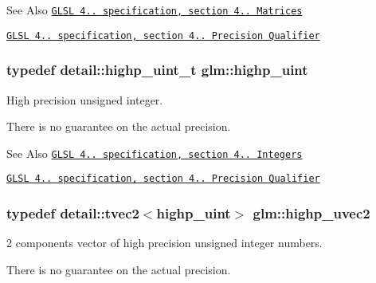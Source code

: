 \begin{DoxySeeAlso}{See Also}
\href{http://www.opengl.org/registry/doc/GLSLangSpec.4.20.8.pdf}{\tt G\-L\-S\-L 4.. specification, section 4.. Matrices} 

\href{http://www.opengl.org/registry/doc/GLSLangSpec.4.20.8.pdf}{\tt G\-L\-S\-L 4.. specification, section 4.. Precision Qualifier} 
\end{DoxySeeAlso}
\hypertarget{group__core__precision_gabfd1cf11193324a5f77d3831b6ac3205}{
\subsubsection[{highp\-\_\-uint}]{\setlength{\rightskip}{0pt plus 5cm}typedef detail\-::highp\-\_\-uint\-\_\-t {\bf glm\-::highp\-\_\-uint}}}\label{group__core__precision_gabfd1cf11193324a5f77d3831b6ac3205}


High precision unsigned integer. 

There is no guarantee on the actual precision.

\begin{DoxySeeAlso}{See Also}
\href{http://www.opengl.org/registry/doc/GLSLangSpec.4.20.8.pdf}{\tt G\-L\-S\-L 4.. specification, section 4.. Integers} 

\href{http://www.opengl.org/registry/doc/GLSLangSpec.4.20.8.pdf}{\tt G\-L\-S\-L 4.. specification, section 4.. Precision Qualifier} 
\end{DoxySeeAlso}
\hypertarget{group__core__precision_ga1c56d043a20a6db84fc3d18b227875fb}{
\subsubsection[{highp\-\_\-uvec2}]{\setlength{\rightskip}{0pt plus 5cm}typedef detail\-::tvec2$<$highp\-\_\-uint$>$ {\bf glm\-::highp\-\_\-uvec2}}}\label{group__core__precision_ga1c56d043a20a6db84fc3d18b227875fb}


2 components vector of high precision unsigned integer numbers. 

There is no guarantee on the actual precision.

